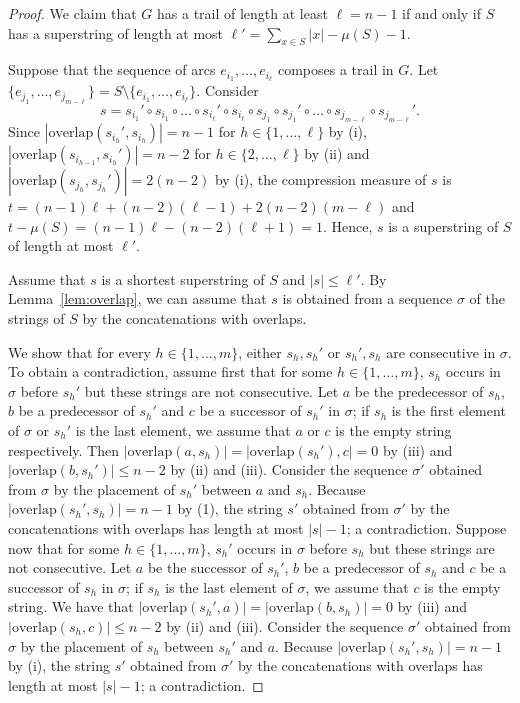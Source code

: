 \documentclass[11pt]{article}
\newcommand{\overlap}{\textrm{overlap}}
\begin{document}
\begin{proof}
We claim that $G$ has a  trail of length at least $\ell=n-1$ if and only if $S$ has a superstring of length at most $\ell'=\sum_{x\in S}|x|-\mu(S)-1$.

Suppose that the sequence of arcs $e_{i_1},\ldots,e_{i_{\ell}}$ composes a trail in $G$. Let $\{e_{j_1},\ldots,e_{j_{m-\ell}}\}=S\setminus\{e_{i_1},\ldots,e_{i_{\ell}}\}$.
Consider $$s=s_{i_1}'\circ s_{i_1}\circ \ldots\circ s_{i_\ell}'\circ s_{i_\ell}\circ s_{j_1}\circ s_{j_1}'\circ\ldots\circ   s_{j_{m-\ell}}\circ s_{j_{m-\ell}}' .$$
Since $|\overlap(s_{i_h}',s_{i_h})|=n-1$ for $h\in\{1,\ldots,\ell\}$ by (i), $|\overlap(s_{i_{h-1}},s_{i_h}')|=n-2$ for $h\in\{2,\ldots,\ell\}$ by (ii) and
$|\overlap(s_{j_h}, s_{j_h}')|=2(n-2)$ by (i), the compression measure of $s$ is $t=(n-1)\ell+(n-2)(\ell-1)+ 2(n-2)(m-\ell)$ and 
$t-\mu(S)=(n-1)\ell-(n-2)(\ell+1)=1$. Hence, $s$ is a superstring of $S$ of length at most $\ell'$.

Assume that $s$ is a shortest superstring of $S$ and $|s|\leq \ell'$. By Lemma~\ref{lem:overlap}, we can assume that $s$ is obtained from a sequence $\sigma$ of the strings of $S$ by the concatenations with overlaps.

We show that for every $h\in\{1,\ldots,m\}$, either $s_h,s_h'$ or $s_h',s_h$ are consecutive in $\sigma$. To obtain a contradiction, assume first that for some $h\in\{1,\ldots,m\}$, $s_h$ occurs in $\sigma$ before $s_h'$ but these strings are not consecutive.  Let $a$ be the predecessor of $s_h$, $b$ be a predecessor of $s_h'$ and $c$ be a successor of $s_h'$ in $\sigma$; if $s_h$ is the first element of $\sigma$ or $s_h'$ is the last element, we assume that $a$ or $c$ is the empty string respectively. 
Then $|\overlap(a,s_h)|=|\overlap(s_h'),c|=0$ by (iii) and $|\overlap(b,s_h')|\leq n-2$ by (ii) and (iii). Consider the sequence 
$\sigma'$ obtained from $\sigma$ by the placement of $s_h'$ between $a$ and $s_h$. Because $|\overlap(s_h',s_h)|=n-1$ by (1), the string $s'$ obtained from $\sigma'$ by the concatenations with overlaps has length at  most $|s|-1$; a contradiction.  Suppose now that      
for some $h\in\{1,\ldots,m\}$, $s_h'$ occurs in $\sigma$ before $s_h$ but these strings are not consecutive. Let  $a$ be the successor of $s_h'$, $b$ be a predecessor of $s_h$ and $c$ be a successor of $s_h$ in $\sigma$; if $s_h$ is the  last element of $\sigma$, we assume that $c$ is the empty string. 
We have that  $|\overlap(s_h',a)|=|\overlap(b,s_h)|=0$ by (iii) and $|\overlap(s_h,c)|\leq n-2$ by (ii) and (iii). Consider the sequence 
$\sigma'$ obtained from $\sigma$ by the placement of $s_h$ between $s_h'$ and $a$. Because $|\overlap(s_h',s_h)|=n-1$ by (i), the string $s'$ obtained from $\sigma'$ by the concatenations with overlaps has length at  most $|s|-1$; a contradiction. 


\end{proof}
\end{document}
